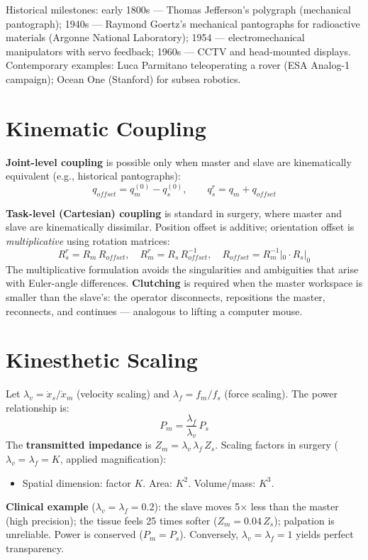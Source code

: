 \documentclass[11pt,a4paper,twoside]{report}
\begin{document}
Historical milestones: early 1800s — Thomas Jefferson's polygraph (mechanical pantograph); 1940s — Raymond Goertz's mechanical pantographs for radioactive materials (Argonne National Laboratory); 1954 — electromechanical manipulators with servo feedback; 1960s — CCTV and head-mounted displays. Contemporary examples: Luca Parmitano teleoperating a rover (ESA Analog-1 campaign); Ocean One (Stanford) for subsea robotics.

\section{Kinematic Coupling}
\textbf{Joint-level coupling} is possible only when master and slave are kinematically equivalent (e.g., historical pantographs):
\[
    q_{offset} = q_m^{(0)} - q_s^{(0)}, \qquad q_s^r = q_m + q_{offset}
\]

\textbf{Task-level (Cartesian) coupling} is standard in surgery, where master and slave are kinematically dissimilar. Position offset is additive; orientation offset is \textit{multiplicative} using rotation matrices:
\[
    R_s^r = R_m\,R_{offset}, \quad R_m^r = R_s\,R_{offset}^{-1}, \quad R_{offset} = R_m^{-1}|_0 \cdot R_s|_0
\]
The multiplicative formulation avoids the singularities and ambiguities that arise with Euler-angle differences. \textbf{Clutching} is required when the master workspace is smaller than the slave's: the operator disconnects, repositions the master, reconnects, and continues — analogous to lifting a computer mouse.

\section{Kinesthetic Scaling}
Let $\lambda_v = \dot{x}_s / \dot{x}_m$ (velocity scaling) and $\lambda_f = f_m / f_s$ (force scaling). The power relationship is:
\[
    P_m = \frac{\lambda_f}{\lambda_v}\,P_s
\]
The \textbf{transmitted impedance} is $Z_m = \lambda_v\,\lambda_f\,Z_s$. Scaling factors in surgery ($\lambda_v = \lambda_f = K$, applied magnification):
\begin{itemize}
    \item Spatial dimension: factor $K$. Area: $K^2$. Volume/mass: $K^3$.
\end{itemize}
\textbf{Clinical example} ($\lambda_v = \lambda_f = 0.2$): the slave moves 5$\times$ less than the master (high precision); the tissue feels 25 times softer ($Z_m = 0.04\,Z_s$); palpation is unreliable. Power is conserved ($P_m = P_s$). Conversely, $\lambda_v = \lambda_f = 1$ yields perfect transparency.
\end{document}
